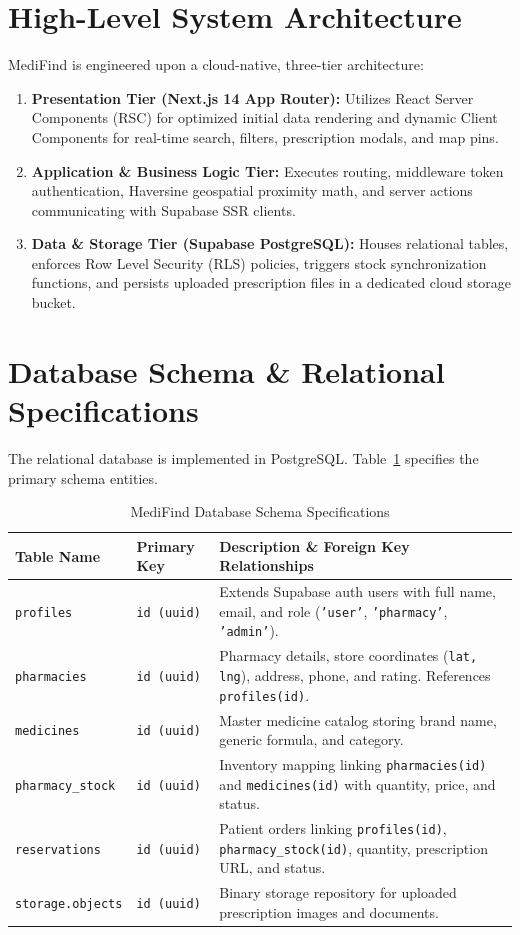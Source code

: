 \documentclass[12pt,a4paper]{report}
\begin{document}
\section{High-Level System Architecture}
MediFind is engineered upon a cloud-native, three-tier architecture:
\begin{enumerate}
    \item \textbf{Presentation Tier (Next.js 14 App Router):} Utilizes React Server Components (RSC) for optimized initial data rendering and dynamic Client Components for real-time search, filters, prescription modals, and map pins.
    \item \textbf{Application & Business Logic Tier:} Executes routing, middleware token authentication, Haversine geospatial proximity math, and server actions communicating with Supabase SSR clients.
    \item \textbf{Data & Storage Tier (Supabase PostgreSQL):} Houses relational tables, enforces Row Level Security (RLS) policies, triggers stock synchronization functions, and persists uploaded prescription files in a dedicated cloud storage bucket.
\end{enumerate}

\section{Database Schema & Relational Specifications}
The relational database is implemented in PostgreSQL. Table~\ref{tab:database_schema} specifies the primary schema entities.

\begin{table}[htbp]
\centering
\caption{MediFind Database Schema Specifications}
\label{tab:database_schema}
\begin{tabular}{p{3.5cm}p{2.8cm}p{8.5cm}}
\toprule
\textbf{Table Name} & \textbf{Primary Key} & \textbf{Description \& Foreign Key Relationships} \\
\midrule
\texttt{profiles} & \texttt{id (uuid)} & Extends Supabase auth users with full name, email, and role (\texttt{'user'}, \texttt{'pharmacy'}, \texttt{'admin'}). \\
\texttt{pharmacies} & \texttt{id (uuid)} & Pharmacy details, store coordinates (\texttt{lat, lng}), address, phone, and rating. References \texttt{profiles(id)}. \\
\texttt{medicines} & \texttt{id (uuid)} & Master medicine catalog storing brand name, generic formula, and category. \\
\texttt{pharmacy\_stock} & \texttt{id (uuid)} & Inventory mapping linking \texttt{pharmacies(id)} and \texttt{medicines(id)} with quantity, price, and status. \\
\texttt{reservations} & \texttt{id (uuid)} & Patient orders linking \texttt{profiles(id)}, \texttt{pharmacy\_stock(id)}, quantity, prescription URL, and status. \\
\texttt{storage.objects} & \texttt{id (uuid)} & Binary storage repository for uploaded prescription images and documents. \\
\bottomrule
\end{tabular}
\end{table}
\end{document}
